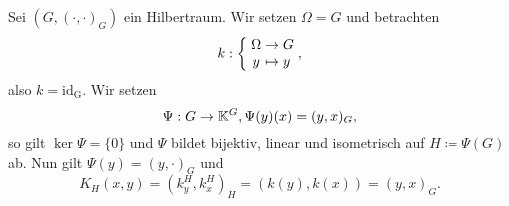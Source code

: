 \begin{example}
    Sei $(G, (\cdot, \cdot)_G)$ ein Hilbertraum. Wir setzen $\Omega = G$ und betrachten
    $$ \mapping{k}{\Omega & \to & G}{y & \mapsto & y}, $$
    also $k = \mathrm{id_G}$. Wir setzen
    $$ \Psi : G \to \mathbb{K}^G, \Psi(y)(x) = (y, x)_G, $$
    so gilt $\ker \Psi = \{ 0 \}$ und $\Psi$ bildet bijektiv, linear und isometrisch auf $H \coloneqq \Psi(G)$ ab. Nun gilt $\Psi(y) = (y, \cdot)_G$ und
    $$ K_H(x, y) = (k_y^H, k_x^H)_H = (k(y), k(x)) = (y, x)_G. $$
\end{example}